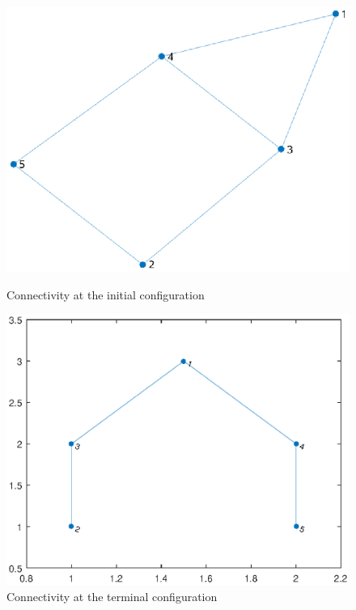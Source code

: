 \documentclass[a4paper, english]{article}
\begin{document}
\begin{figure}[ht]
  \begin{minipage}[b]{0.5\textwidth}
    \includegraphics[width=\textwidth]{figures/a5_D_cg0.eps}
    \caption{Connectivity at the initial configuration}
    \label{g0}
  \end{minipage}
  \hfill
  \begin{minipage}[b]{0.5\textwidth}
    \includegraphics[width=\textwidth]{figures/a5_D_cgT.eps}
    \caption{Connectivity at the terminal configuration}
    \label{gT}
  \end{minipage}
\end{figure}
\end{document}
